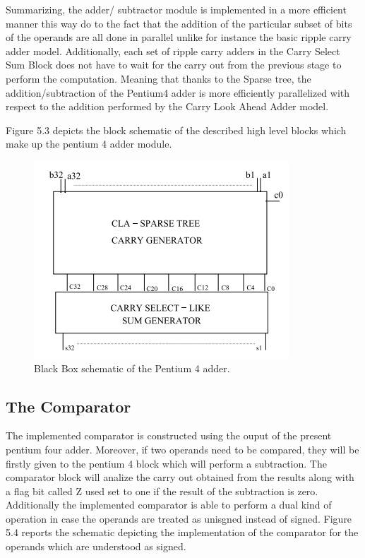     Summarizing, the adder/ subtractor module is implemented in a more efficient manner this way do to the fact that the addition of the particular subset of bits of the operands
    are all done in parallel unlike for instance the basic ripple carry adder model. Additionally, each set of ripple carry adders in the Carry Select Sum Block does not have to 
    wait for the carry out from the previous stage to perform the computation. Meaning that thanks to the Sparse tree, the addition/subtraction of the Pentium4 adder is more efficiently parallelized with respect to the addition
    performed by the Carry Look Ahead Adder model.

    Figure 5.3 depicts the block schematic of the described high level blocks which make up the pentium 4 adder module.

    \begin{figure}[h!]
        \centering
        \includegraphics[scale = 1]
        {chapters/figures/Pentium4Adder}
        \caption{Black Box schematic of the Pentium 4 adder.}
        \label{fig:Pentium4Adder}
        \end{figure}

    \subsection{ The Comparator }
        The implemented comparator is constructed using the ouput of the present pentium four adder. Moreover, if two operands need to be compared,
        they will be firstly given to the pentium 4 block which will perform a subtraction. The comparator block will analize the carry out obtained from the results
        along with a flag bit called Z used set to one if the result of the subtraction is zero.
        Additionally the implemented comparator is able to perform a dual kind of operation in case the operands are treated as unisgned instead of signed.
        Figure 5.4 reports the schematic depicting the implementation of the comparator for the operands which are understood as signed.

